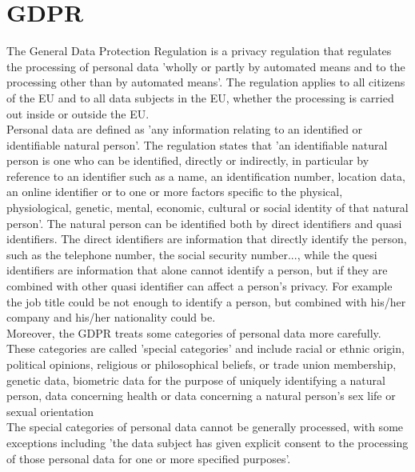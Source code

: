 \section{GDPR}
The General Data Protection Regulation is a privacy regulation that regulates the processing of personal data 'wholly or partly by automated means and to the processing other than by automated means'. The regulation applies to all citizens of the EU and to all data subjects in the EU, whether the processing is carried out inside or outside the EU. \\
Personal data are defined as 'any information relating to an identified or identifiable natural person'. The regulation states that 'an identifiable natural person is one who can be identified, directly or indirectly, in particular by reference to an identifier such as a name, an identification number, location data, an online identifier or to one or more factors specific to the physical, physiological, genetic, mental, economic, cultural or social identity of that natural person'. The natural person can be identified both by direct identifiers and quasi identifiers. The direct identifiers are information that directly identify the person, such as the telephone number, the social security number..., while the quesi identifiers are information that alone cannot identify a person, but if they are combined with other quasi identifier can affect a person's privacy. For example the job title could be not enough to identify a person, but combined with his/her company and his/her nationality could be. \\
Moreover, the GDPR treats some categories of personal data more carefully. These categories are called 'special categories' and include racial or ethnic origin, political opinions, religious or philosophical beliefs, or trade union membership, genetic data, biometric data for the purpose of uniquely identifying a natural person, data concerning health or data concerning a natural person’s sex life or sexual orientation \\
The special categories of personal data cannot be generally processed, with some exceptions including 'the data subject has given explicit consent to the processing of those personal data for one or more specified purposes'.\\


